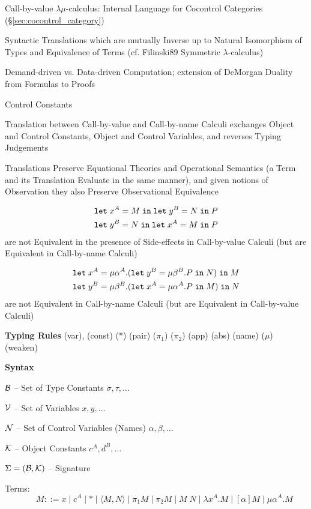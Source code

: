 Call-by-value $\lambda\mu$-calculus: Internal Language for Cocontrol
Categories (\S\ref{sec:cocontrol_category})

Syntactic Translations which are mutually Inverse up to Natural
Isomorphism of Types and Equivalence of Terms (cf. Filinski89
Symmetric $\lambda$-calculus) %

Demand-driven vs. Data-driven Computation; extension of DeMorgan
Duality from Formulas to Proofs %

Control Constants %

Translation between Call-by-value and Call-by-name Calculi exchanges
Object and Control Constants, Object and Control Variables, and
reverses Typing Judgements

Translations Preserve Equational Theories and Operational Semantics (a
Term and its Translation Evaluate in the same manner), and given
notions of Observation they also Preserve Observational Equivalence

\begin{align*}
  & \mathtt{let}\;x^A = M\;\mathtt{in}\;\mathtt{let}\;y^B = N\;\mathtt{in}\;P \\
  & \mathtt{let}\;y^B = N\;\mathtt{in}\;\mathtt{let}\;x^A = M\;\mathtt{in}\;P
\end{align*}
are not Equivalent in the presence of Side-effects in Call-by-value
Calculi (but are Equivalent in Call-by-name Calculi)

\begin{align*}
  & \mathtt{let}\;x^A = \mu\alpha^A.
    (\mathtt{let}\;y^B = \mu\beta^B.P\;\mathtt{in}\;N)\;\mathtt{in}\;M \\
  & \mathtt{let}\;y^B = \mu\beta^B.
    (\mathtt{let}\;x^A = \mu\alpha^A.P\;\mathtt{in}\;M)\;\mathtt{in}\;N
\end{align*}
are not Equivalent in Call-by-name Calculi (but are Equivalent in
Call-by-value Calculi)


\textbf{Typing Rules} (var), (const) (*) (pair) ($\pi_1$) ($\pi_2$)
(app) (abs) (name) ($\mu$) (weaken) %


\textbf{Syntax}

$\mathcal{B}$ -- Set of Type Constants $\sigma,\tau,\ldots$

$\mathcal{V}$ -- Set of Variables $x,y,\ldots$

$\mathcal{N}$ -- Set of Control Variables (Names) $\alpha,\beta,\ldots$

$\mathcal{K}$ -- Object Constants $c^A,d^B,\ldots$

$\Sigma = (\mathcal{B},\mathcal{K})$ -- Signature

Terms:
\[
  \quad\quad M ::= x \mid c^A \mid * \mid \langle M,N \rangle
    \mid \pi_1 M \mid \pi_2 M \mid M\;N \mid \lambda x^A.M
    \mid [\alpha]M \mid \mu\alpha^A.M
\]

